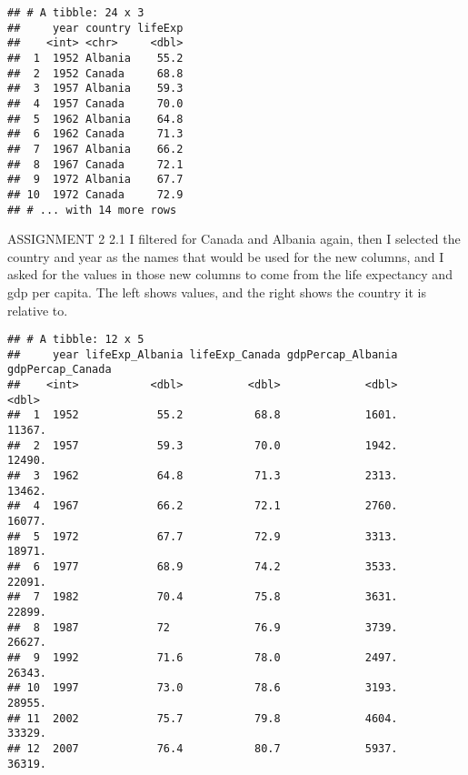 \documentclass[]{article}
\newenvironment{Shaded}{\begin{snugshade}}{\end{snugshade}}
\newcommand{\KeywordTok}[1]{\textcolor[rgb]{0.13,0.29,0.53}{\textbf{#1}}}
\newcommand{\DataTypeTok}[1]{\textcolor[rgb]{0.13,0.29,0.53}{#1}}
\newcommand{\StringTok}[1]{\textcolor[rgb]{0.31,0.60,0.02}{#1}}
\newcommand{\OperatorTok}[1]{\textcolor[rgb]{0.81,0.36,0.00}{\textbf{#1}}}
\newcommand{\NormalTok}[1]{#1}
\begin{document}
\begin{verbatim}
## # A tibble: 24 x 3
##     year country lifeExp
##    <int> <chr>     <dbl>
##  1  1952 Albania    55.2
##  2  1952 Canada     68.8
##  3  1957 Albania    59.3
##  4  1957 Canada     70.0
##  5  1962 Albania    64.8
##  6  1962 Canada     71.3
##  7  1967 Albania    66.2
##  8  1967 Canada     72.1
##  9  1972 Albania    67.7
## 10  1972 Canada     72.9
## # ... with 14 more rows
\end{verbatim}

ASSIGNMENT 2 2.1 I filtered for Canada and Albania again, then I
selected the country and year as the names that would be used for the
new columns, and I asked for the values in those new columns to come
from the life expectancy and gdp per capita. The left shows values, and
the right shows the country it is relative to.

\begin{Shaded}
\end{Shaded}

\begin{verbatim}
## # A tibble: 12 x 5
##     year lifeExp_Albania lifeExp_Canada gdpPercap_Albania gdpPercap_Canada
##    <int>           <dbl>          <dbl>             <dbl>            <dbl>
##  1  1952            55.2           68.8             1601.           11367.
##  2  1957            59.3           70.0             1942.           12490.
##  3  1962            64.8           71.3             2313.           13462.
##  4  1967            66.2           72.1             2760.           16077.
##  5  1972            67.7           72.9             3313.           18971.
##  6  1977            68.9           74.2             3533.           22091.
##  7  1982            70.4           75.8             3631.           22899.
##  8  1987            72             76.9             3739.           26627.
##  9  1992            71.6           78.0             2497.           26343.
## 10  1997            73.0           78.6             3193.           28955.
## 11  2002            75.7           79.8             4604.           33329.
## 12  2007            76.4           80.7             5937.           36319.
\end{verbatim}
\end{document}
